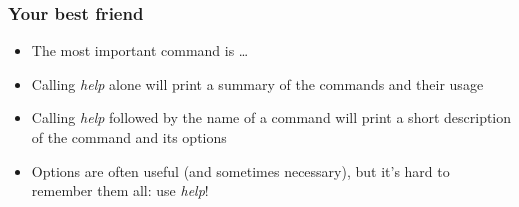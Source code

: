 \documentclass{beamer}
\begin{document}
\frame
{
  \frametitle{Your best friend}
  
  \begin{itemize}
  \item<1-> The most important command is \dots
  		  \uncover<2->{\textit{help}}
  \item<3-> Calling \textit{help} alone will print a summary of the commands and their usage
  \item<4-> Calling \textit{help} followed by the name of a command will print a short description of the command and its options
  \item<5-> Options are often useful (and sometimes necessary), but it's hard to remember them all: use \textit{help}!
  \end{itemize}

}

\bgroup
{}
\begin{frame}[plain]{}
\end{frame}
\egroup
\end{document}
